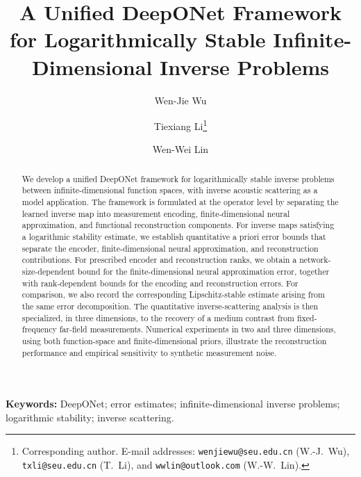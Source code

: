 \documentclass{article}
\numberwithin{equation}{section}
\theoremstyle{plain}
\begin{document}
	\title{\textbf{A Unified DeepONet Framework for Logarithmically Stable Infinite-Dimensional Inverse Problems}}
	
	\author[1]{Wen-Jie Wu}
	\author[1,2]{Tiexiang Li\thanks{Corresponding author. E-mail addresses: \texttt{wenjiewu@seu.edu.cn} (W.-J.~Wu), \texttt{txli@seu.edu.cn} (T.~Li), and \texttt{wwlin@outlook.com} (W.-W.~Lin).}}
	\author[2]{Wen-Wei Lin}
	
	
	
	
	
	\date{}
	
	\maketitle
	
	\begin{abstract}
		We develop a unified DeepONet framework for logarithmically stable inverse problems between infinite-dimensional function spaces, with inverse acoustic scattering as a model application. The framework is formulated at the operator level by separating the learned inverse map into measurement encoding, finite-dimensional neural approximation, and functional reconstruction components. For inverse maps satisfying a logarithmic stability estimate, we establish quantitative a priori error bounds that separate the encoder, finite-dimensional neural approximation, and reconstruction contributions. For prescribed encoder and reconstruction ranks, we obtain a network-size-dependent bound for the finite-dimensional neural approximation error, together with rank-dependent bounds for the encoding and reconstruction errors. For comparison, we also record the corresponding Lipschitz-stable estimate arising from the same error decomposition. The quantitative inverse-scattering analysis is then specialized, in three dimensions, to the recovery of a medium contrast from fixed-frequency far-field measurements. Numerical experiments in two and three dimensions, using both function-space and finite-dimensional priors, illustrate the reconstruction performance and empirical sensitivity to synthetic measurement noise.
	\end{abstract}
	
	\noindent\textbf{Keywords:} DeepONet; error estimates; infinite-dimensional inverse problems; logarithmic stability; inverse scattering.
	
\end{document}
